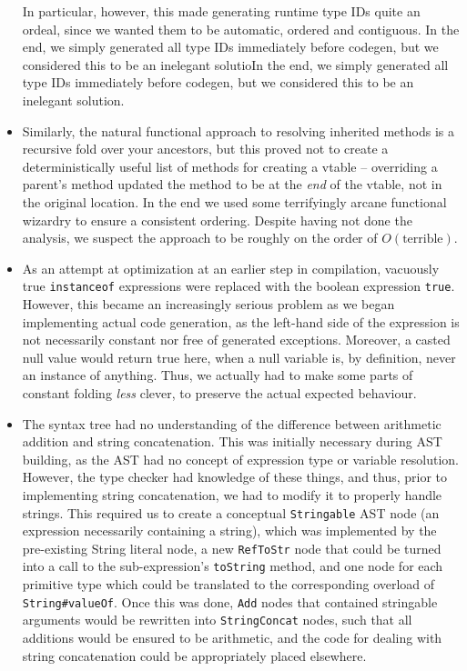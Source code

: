 \documentclass{article}
\begin{document}
\begin{itemize}
        In particular, however, this made generating runtime type IDs quite an ordeal, since we wanted them to be
        automatic, ordered and contiguous. In the end, we simply generated all type IDs immediately before codegen, but
        we considered this to be an inelegant solutioIn the end, we simply generated all type IDs immediately before
        codegen, but we considered this to be an inelegant solution.
    \item Similarly, the natural functional approach to resolving inherited methods is a recursive fold over your
        ancestors, but this proved not to create a deterministically useful list of methods for creating a vtable --
        overriding a parent's method updated the method to be at the \textit{end} of the vtable, not in the original
        location. In the end we used some terrifyingly arcane functional wizardry to ensure a consistent ordering.
        Despite having not done the analysis, we suspect the approach to be roughly on the order of $O(\text{terrible})$.
    \item As an attempt at optimization at an earlier step in compilation, vacuously true \texttt{instanceof} expressions
       were replaced with the boolean expression \texttt{true}. However, this became an increasingly serious problem as
       we began implementing actual code generation, as the left-hand side of the expression is not necessarily constant
       nor free of generated exceptions. Moreover, a casted null value would return true here, when a null variable is,
       by definition, never an instance of anything. Thus, we actually had to make some parts of constant folding \textit{less}
       clever, to preserve the actual expected behaviour.
    \item The syntax tree had no understanding of the difference between arithmetic addition and string concatenation.
       This was initially necessary during AST building, as the AST had no concept of expression type or variable resolution.
       However, the type checker had knowledge of these things, and thus, prior to implementing string concatenation, we
       had to modify it to properly handle strings. This required us to create a conceptual \texttt{Stringable} AST node
       (an expression necessarily containing a string), which was implemented by the pre-existing String literal node, a new
       \texttt{RefToStr} node that could be turned into a call to the sub-expression's \texttt{toString} method, and one
       node for each primitive type which could be translated to the corresponding overload of \texttt{String\#valueOf}.
       Once this was done, \texttt{Add} nodes that contained stringable arguments would be rewritten into \texttt{StringConcat}
       nodes, such that all additions would be ensured to be arithmetic, and the code for dealing with string concatenation
       could be appropriately placed elsewhere.
\end{itemize}
\end{document}
